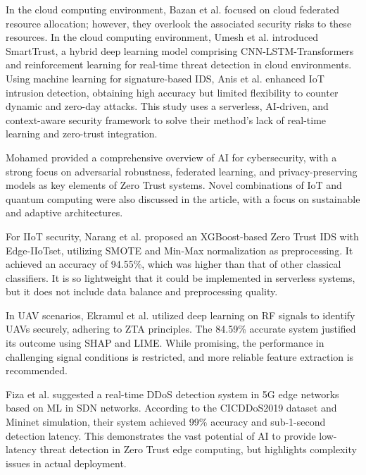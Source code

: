 \documentclass[conference]{IEEEtran}
\begin{document}
In the cloud computing environment, Bazan et al. \cite{bazan2019recommending} focused on cloud federated resource allocation; however, they overlook the associated security risks to these resources. 
In the cloud computing environment, Umesh et al. \cite{lilhore2025smarttrust} introduced SmartTrust, a hybrid deep learning model comprising CNN-LSTM-Transformers and reinforcement learning for real-time threat detection in cloud environments.
Using machine learning for signature-based IDS, Anis et al. \cite{anis2025enhancing} enhanced IoT intrusion detection, obtaining high accuracy but limited flexibility to counter dynamic and zero-day attacks. This study uses a serverless, AI-driven, and context-aware security framework to solve their method's lack of real-time learning and zero-trust integration.


Mohamed \cite{mohamed2025artificial} provided a comprehensive overview of AI for cybersecurity, with a strong focus on adversarial robustness, federated learning, and privacy-preserving models as key elements of Zero Trust systems. Novel combinations of IoT and quantum computing were also discussed in the article, with a focus on sustainable and adaptive architectures.

For IIoT security, Narang et al. \cite{narang2025zero} proposed an XGBoost-based Zero Trust IDS with Edge-IIoTset, utilizing SMOTE and Min-Max normalization as preprocessing. It achieved an accuracy of 94.55\%, which was higher than that of other classical classifiers. It is so lightweight that it could be implemented in serverless systems, but it does not include data balance and preprocessing quality.

In UAV scenarios, Ekramul et al. \cite{haque2024enhancing} utilized deep learning on RF signals to identify UAVs securely, adhering to ZTA principles. The 84.59\% accurate system justified its outcome using SHAP and LIME. While promising, the performance in challenging signal conditions is restricted, and more reliable feature extraction is recommended.

Fiza et al. \cite{ashfaq2025enhancing} suggested a real-time DDoS detection system in 5G edge networks based on ML in SDN networks. According to the CICDDoS2019 dataset and Mininet simulation, their system achieved 99\% accuracy and sub-1-second detection latency. This demonstrates the vast potential of AI to provide low-latency threat detection in Zero Trust edge computing, but highlights complexity issues in actual deployment.
\end{document}
